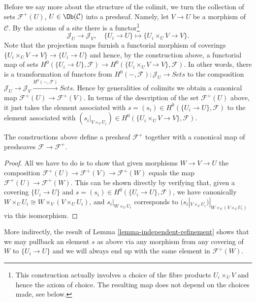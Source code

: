 \medskip\noindent
Before we say more about the structure of the colimit, we turn
the collection of sets
$\mathcal{F}^{+}(U)$, $U \in \Ob(\mathcal{C})$
into a presheaf. Namely, let $V \to U$ be a morphism of $\mathcal{C}$.
By the axioms of a site there is a functor\footnote{This construction
actually involves a choice of the fibre products $U_i \times_U V$
and hence the axiom of choice. The resulting map does not depend on
the choices made, see below.}
$$
\mathcal{J}_U
\longrightarrow
\mathcal{J}_V, \quad
\{U_i \to U\}
\longmapsto
\{U_i \times_U V \to V\}.
$$
Note that the projection maps furnish a functorial
morphism of coverings $\{U_i \times_U V \to V\} \to \{U_i \to U\}$
and hence, by the construction above, a functorial map of sets
$H^0(\{U_i \to U\}, \mathcal{F}) \to
H^0(\{U_i \times_U V \to V\}, \mathcal{F})$.
In other words, there is a transformation of functors
from $H^0(-, \mathcal{F}) : \mathcal{J}_U \to \textit{Sets}$
to the composition $\mathcal{J}_U \to \mathcal{J}_V
\xrightarrow{H^0(-, \mathcal{F})} \textit{Sets}$. Hence by
generalities of colimits we obtain a canonical map
$\mathcal{F}^+(U) \to \mathcal{F}^+(V)$. In terms of the description
of the set $\mathcal{F}^+(U)$ above, it just takes the element
associated with $s = (s_i) \in H^0(\{U_i \to U\}, \mathcal{F})$ to the
element associated with $(s_i|_{V \times_U U_i})
\in H^0(\{U_i \times_U V \to V\}, \mathcal{F})$.

\begin{lemma}
\label{lemma-plus-presheaf}
The constructions above define a presheaf
$\mathcal{F}^+$ together with a canonical
map of presheaves $\mathcal{F} \to \mathcal{F}^+$.
\end{lemma}

\begin{proof}
All we have to do is to show that given morphisms
$W \to V \to U$ the composition $\mathcal{F}^+(U)
\to \mathcal{F}^+(V) \to \mathcal{F}^+(W)$
equals the map $\mathcal{F}^+(U) \to \mathcal{F}^+(W)$.
This can be shown directly by verifying that, given
a covering $\{U_i \to U\}$ and
$s = (s_i) \in H^0(\{U_i \to U\}, \mathcal{F})$,
we have canonically
$W \times_U U_i \cong W \times_V (V \times_U U_i)$,
and
$s_i|_{W \times_U U_i}$
corresponds to
$(s_i|_{V \times_U U_i})|_{W \times_V (V \times_U U_i)}$
via this isomorphism.
\end{proof}

\noindent
More indirectly, the result of
Lemma \ref{lemma-independent-refinement} shows that
we may pullback an element $s$ as above via any morphism
from any covering of $W$ to $\{U_i \to U\}$
and we will always end up with the same element in
$\mathcal{F}^+(W)$.


